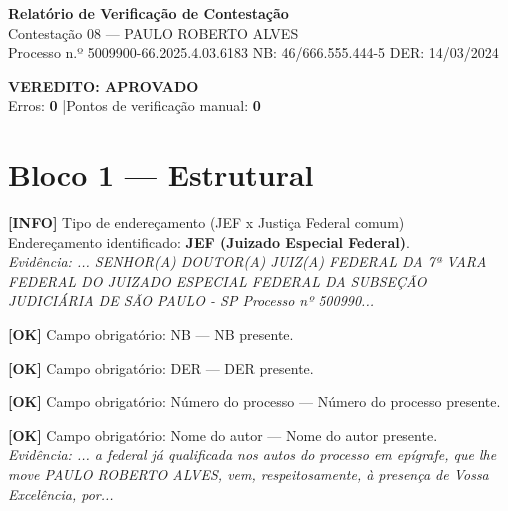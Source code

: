 \documentclass[12pt,a4paper]{article}
\newcommand{\statusOK}[1]{\textcolor{corOK}{\textbf{[OK]}} #1}
\newcommand{\statusINFO}[1]{\textcolor{corINFO}{\textbf{[INFO]}} #1}
\begin{document}
\begin{center}
  {\LARGE \textbf{Relatório de Verificação de Contestação}}\\[0.4em]
  {\large Contestação 08 --- PAULO ROBERTO ALVES}\\[0.2em]
  {\small Processo n.º 5009900-66.2025.4.03.6183 \quad NB: 46/666.555.444-5 \quad DER: 14/03/2024}
\end{center}

\vspace{0.5em}

\noindent\colorbox{corFundoAprovado}{%
  \begin{minipage}{\dimexpr\linewidth-2\fboxsep}
    \centering
    \vspace{0.3em}
    {\large \textcolor{corOK}{\textbf{VEREDITO: APROVADO}}}\\
    Erros: \textbf{0} \quad|\quad Pontos de verificação manual: \textbf{0}
    \vspace{0.3em}
  \end{minipage}%
}

\vspace{1em}


\section{Bloco 1 --- Estrutural}

\statusINFO{Tipo de endereçamento (JEF x Justiça Federal comum)}\\
Endereçamento identificado: \textbf{JEF (Juizado Especial Federal)}.\\
\textit{Evidência: ... SENHOR(A) DOUTOR(A) JUIZ(A) FEDERAL DA 7ª VARA FEDERAL DO JUIZADO ESPECIAL FEDERAL DA SUBSEÇÃO JUDICIÁRIA DE SÃO PAULO - SP Processo nº 500990...}

\medskip
\statusOK{Campo obrigatório: NB} --- NB presente.

\medskip
\statusOK{Campo obrigatório: DER} --- DER presente.

\medskip
\statusOK{Campo obrigatório: Número do processo} --- Número do processo presente.

\medskip
\statusOK{Campo obrigatório: Nome do autor} --- Nome do autor presente.\\
\textit{Evidência: ... a federal já qualificada nos autos do processo em epígrafe, que lhe move PAULO ROBERTO ALVES, vem, respeitosamente, à presença de Vossa Excelência, por...}
\end{document}
